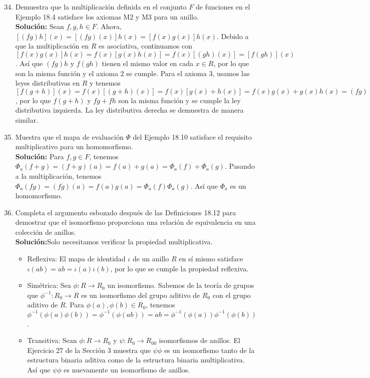 \begin{enumerate}
	\setcounter{enumi}{33}
	\item Demuestra que la multiplicación definida en el conjunto $F$ de funciones en el Ejemplo 18.4 satisface los axiomas M2 y M3 para un anillo. 
	\\ \textbf{Solución:}
	Sean $f, g, h \in F$. Ahora, $[(fg)h](x) = [(fg)(x)]h(x) = [f(x)g(x)]h(x)$. Debido a que la multiplicación en $R$ es asociativa, continuamos con $[f(x)g(x)]h(x) = f(x)[g(x)h(x)] = f(x)[(gh)(x)] = [f(gh)](x)$. Así que $(fg)h$ y $f(gh)$ tienen el mismo valor en cada $x \in R$, por lo que son la misma función y el axioma 2 se cumple. Para el axioma 3, usamos las leyes distributivas en $R$ y tenemos $[f(g + h)](x) = f(x)[(g + h)(x)] = f(x)[g(x) + h(x)] = f(x)g(x) + g(x)h(x) = (fg)(x) + (fh)(x) = (fg + fh)(x)$, por lo que $f(g + h)$ y $fg + fh$ son la misma función y se cumple la ley distributiva izquierda. La ley distributiva derecha se demuestra de manera similar.
	\item Muestra que el mapa de evaluación $\Phi$ del Ejemplo 18.10 satisface el requisito multiplicativo para un homomorfismo.
	\\ \textbf{Solución:}
	Para $f, g \in F$, tenemos $\Phi_a(f + g) = (f + g)(a) = f(a) + g(a) = \Phi_a(f) + \Phi_a(g)$. Pasando a la multiplicación, tenemos $\Phi_a(fg) = (fg)(a) = f(a)g(a) = \Phi_a(f)\Phi_a(g)$. Así que $\Phi_a$ es un homomorfismo.
	\item Completa el argumento esbozado después de las Definiciones 18.12 para demostrar que el isomorfismo proporciona una relación de equivalencia en una colección de anillos.
	\\ \textbf{Solución:}Solo necesitamos verificar la propiedad multiplicativa.
	\begin{itemize}
		\item Reflexiva: El mapa de identidad $\iota$ de un anillo $R$ en sí mismo satisface $\iota(ab) = ab = \iota(a)\iota(b)$, por lo que se cumple la propiedad reflexiva.
		\item Simétrica: Sea $\phi: R \to R_0$ un isomorfismo. Sabemos de la teoría de grupos que $\phi^{-1}: R_0 \to R$ es un isomorfismo del grupo aditivo de $R_0$ con el grupo aditivo de $R$. Para $\phi(a), \phi(b) \in R_0$, tenemos $\phi^{-1}(\phi(a)\phi(b)) = \phi^{-1}(\phi(ab)) = ab = \phi^{-1}(\phi(a))\phi^{-1}(\phi(b))$.
		\item Transitiva: Sean $\phi: R \to R_0$ y $\psi: R_0 \to R_{00}$ isomorfismos de anillos. El Ejercicio 27 de la Sección 3 muestra que $\psi\phi$ es un isomorfismo tanto de la estructura binaria aditiva como de la estructura binaria multiplicativa. Así que $\psi\phi$ es nuevamente un isomorfismo de anillos.

\end{itemize}
\end{enumerate}
